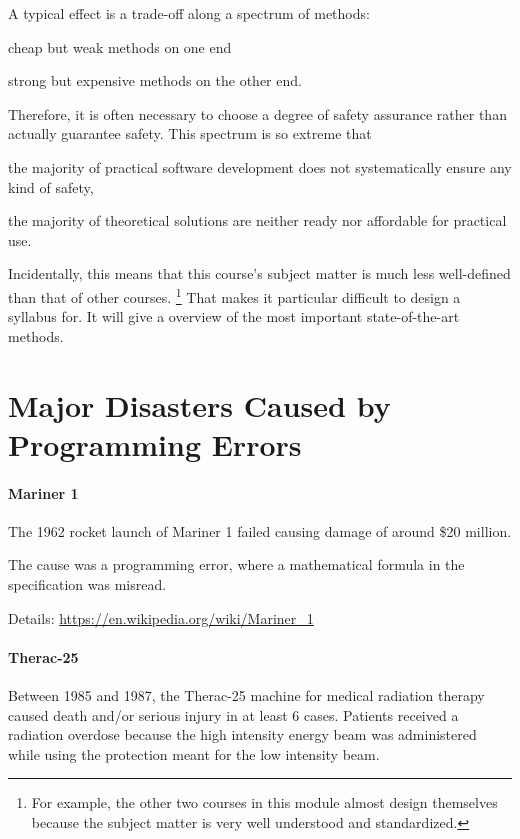 A typical effect is a trade-off along a spectrum of methods:
\begin{compactitem}
 \item cheap but weak methods on one end
 \item strong but expensive methods on the other end.
\end{compactitem}
Therefore, it is often necessary to choose a degree of safety assurance rather than actually guarantee safety.
This spectrum is so extreme that
\begin{compactitem}
 \item the majority of practical software development does not systematically ensure any kind of safety,
 \item the majority of theoretical solutions are neither ready nor affordable for practical use.
\end{compactitem}

Incidentally, this means that this course's subject matter is much less well-defined than that of other courses.%
\footnote{For example, the other two courses in this module almost design themselves because the subject matter is very well understood and standardized.}
That makes it particular difficult to design a syllabus for.
It will give a overview of the most important state-of-the-art methods.

\section{Major Disasters Caused by Programming Errors}

\paragraph{Mariner 1}
The 1962 rocket launch of Mariner 1 failed causing damage of around \$20 million.

The cause was a programming error, where a mathematical formula in the specification was misread.

Details: \url{https://en.wikipedia.org/wiki/Mariner_1}

\paragraph{Therac-25}
Between 1985 and 1987, the Therac-25 machine for medical radiation therapy caused death and/or serious injury in at least $6$ cases.
Patients received a radiation overdose because the high intensity energy beam was administered while using the protection meant for the low intensity beam.

